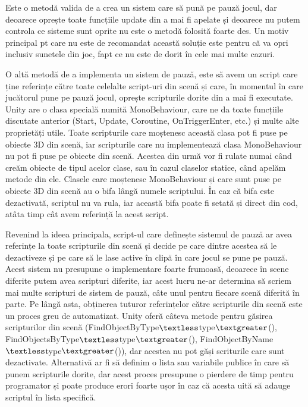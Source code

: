 \documentclass[12pt, a4paper]{article}
\begin{document}
	Este o metodă valida de a crea un sistem care să pună pe pauză jocul, dar deoarece oprește toate funcțiile update din a mai fi apelate și deoarece nu putem controla ce sisteme sunt oprite nu este o metodă folosită foarte des. Un motiv principal pt care nu este de recomandat această soluție este pentru că va opri inclusiv sunetele din joc, fapt ce nu este de dorit în cele mai multe cazuri.
	\newline
	
	O altă metodă de a implementa un sistem de pauză, este să avem un script care ține referințe către toate celelalte script-uri din scenă și care, în momentul în care jucătorul pune pe pauză jocul, oprește scripturile dorite din a mai fi executate. Unity are o clasa specială numită MonoBehaviour, care ne da toate funcțiile discutate anterior (Start, Update, Coroutine, OnTriggerEnter, etc.) și multe alte proprietăți utile. Toate scripturile care moștenesc această clasa pot fi puse pe obiecte 3D din scenă, iar scripturile care nu implementează clasa MonoBehaviour nu pot fi puse pe obiecte din scenă. Acestea din urmă vor fi rulate numai când creăm obiecte de tipul acelor clase, sau în cazul claselor statice, când apelăm metode din ele. Clasele care moștenesc MonoBehaviour și care sunt puse pe obiecte 3D din scenă au o bifa lângă numele scriptului. În caz că bifa este dezactivată, scriptul nu va rula, iar această bifa poate fi setată și direct din cod, atâta timp cât avem referință la acest script. 
	\newline
	
	Revenind la ideea principala, script-ul care definește sistemul de pauză ar avea referințe la toate scripturile din scenă și decide pe care dintre acestea să le dezactiveze și pe care să le lase active în clipă în care jocul se pune pe pauză. Acest sistem nu presupune o implementare foarte frumoasă, deoarece în scene diferite putem avea scripturi diferite, iar acest lucru ne-ar determina să scriem mai multe scripturi de sistem de pauză, câte unul pentru fiecare scenă diferită în parte. Pe lângă asta, obținerea tuturor referințelor către scripturile din scenă este un proces greu de automatizat. Unity oferă câteva metode pentru găsirea scripturilor din scenă (FindObjectByType$\textless$type$\textgreater$(), FindObjectsByType$\textless$type$\textgreater$(), FindObjectByName$\textless$type$\textgreater$()), dar acestea nu pot găși scriturile care sunt dezactivate. Alternativă ar fi să definim o lista sau variabile publice în care să punem scripturile dorite, dar acest proces presupune o pierdere de timp pentru programator și poate produce erori foarte ușor în caz că acesta uită să adauge scriptul în lista specifică.
	\newline
	
\end{document}

